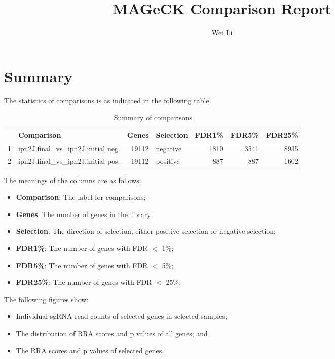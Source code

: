 \documentclass{article}
\begin{document}

\title{MAGeCK Comparison Report}
\author{Wei Li}

\maketitle


\tableofcontents

\section{Summary}


The statistics of comparisons is as indicated in the following table. 

\begin{table}[ht]
\centering
\begin{tabular}{rlrlrrr}
  \hline
 & Comparison & Genes & Selection & FDR1\% & FDR5\% & FDR25\% \\ 
  \hline
1 & ipn2J.final\_vs\_ipn2J.initial neg. & 19112 & negative & 1810 & 3541 & 8935 \\ 
  2 & ipn2J.final\_vs\_ipn2J.initial pos. & 19112 & positive & 887 & 887 & 1602 \\ 
   \hline
\end{tabular}
\caption{Summary of comparisons} 
\label{tab:one}
\end{table}
The meanings of the columns are as follows.

\begin{itemize}
\item \textbf{Comparison}: The label for comparisons;
\item \textbf{Genes}: The number of genes in the library;
\item \textbf{Selection}: The direction of selection, either positive selection or negative selection;
\item \textbf{FDR1\%}: The number of genes with FDR $<$ 1\%;
\item \textbf{FDR5\%}: The number of genes with FDR $<$ 5\%;
\item \textbf{FDR25\%}: The number of genes with FDR $<$ 25\%;
\end{itemize}

The following figures show:

\begin{itemize}
\item Individual sgRNA read counts of selected genes in selected samples; 
\item The distribution of RRA scores and p values of all genes; and
\item The RRA scores and p values of selected genes.
\end{itemize}
\end{document}
